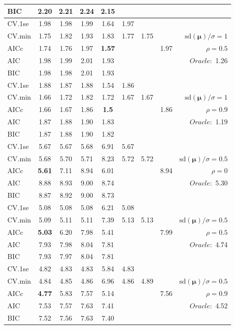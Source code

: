 \begin{table}
\begin{center}
\begin{tabular}{l*{7}{c}|r}
BIC & 2.20 & 2.21 & 2.24 & 2.15 & & & &  \\
 \hline 
CV.1se & 1.98 & 1.98 & 1.99 & 1.64 & 1.97 & & & \\
CV.min & 1.75 & 1.82 & 1.93 & 1.83 & 1.77 & 1.75 & & $\mathrm{sd}(\mathbf{\mu})/\sigma=1$ \\
AICc & 1.74 & 1.76 & 1.97 & {\bf 1.57} & & & 1.97 &  $\rho=0.5$ \\
AIC & 1.98 & 1.99 & 2.01 & 1.93 & & & &  \multirow{2}{*}{$Oracle: $ 1.26} \\
BIC & 1.98 & 1.98 & 2.01 & 1.93 & & & &  \\
 \hline 
CV.1se & 1.88 & 1.87 & 1.88 & 1.54 & 1.86 & & & \\
CV.min & 1.66 & 1.72 & 1.82 & 1.72 & 1.67 & 1.67 & & $\mathrm{sd}(\mathbf{\mu})/\sigma=1$ \\
AICc & 1.66 & 1.67 & 1.86 & {\bf 1.5} & & & 1.86 &  $\rho=0.9$ \\
AIC & 1.87 & 1.88 & 1.90 & 1.83 & & & &  \multirow{2}{*}{$Oracle: $ 1.19} \\
BIC & 1.87 & 1.88 & 1.90 & 1.82 & & & &  \\
 \hline 
CV.1se & 5.67 & 5.67 & 5.68 & 6.91 & 5.67 & & & \\
CV.min & 5.68 & 5.70 & 5.71 & 8.23 & 5.72 & 5.72 & & $\mathrm{sd}(\mathbf{\mu})/\sigma=0.5$ \\
AICc & {\bf 5.61} & 7.11 & 8.94 & 6.01 & & & 8.94 &  $\rho=0$ \\
AIC & 8.88 & 8.93 & 9.00 & 8.74 & & & &  \multirow{2}{*}{$Oracle: $ 5.30} \\
BIC & 8.87 & 8.92 & 9.00 & 8.73 & & & &  \\
 \hline 
CV.1se & 5.08 & 5.08 & 5.08 & 6.21 & 5.08 & & & \\
CV.min & 5.09 & 5.11 & 5.11 & 7.39 & 5.13 & 5.13 & & $\mathrm{sd}(\mathbf{\mu})/\sigma=0.5$ \\
AICc & {\bf 5.03} & 6.20 & 7.98 & 5.41 & & & 7.99 &  $\rho=0.5$ \\
AIC & 7.93 & 7.98 & 8.04 & 7.81 & & & &  \multirow{2}{*}{$Oracle: $ 4.74} \\
BIC & 7.93 & 7.97 & 8.04 & 7.81 & & & &  \\
 \hline 
CV.1se & 4.82 & 4.83 & 4.83 & 5.84 & 4.83 & & & \\
CV.min & 4.84 & 4.85 & 4.86 & 6.96 & 4.86 & 4.89 & & $\mathrm{sd}(\mathbf{\mu})/\sigma=0.5$ \\
AICc & {\bf 4.77} & 5.83 & 7.57 & 5.14 & & & 7.56 &  $\rho=0.9$ \\
AIC & 7.53 & 7.57 & 7.63 & 7.41 & & & &  \multirow{2}{*}{$Oracle: $ 4.52} \\
BIC & 7.52 & 7.56 & 7.63 & 7.40 & & & &  \\
 \hline 
\end{tabular}
\end{center}
\vspace{-1cm}
\end{table}





